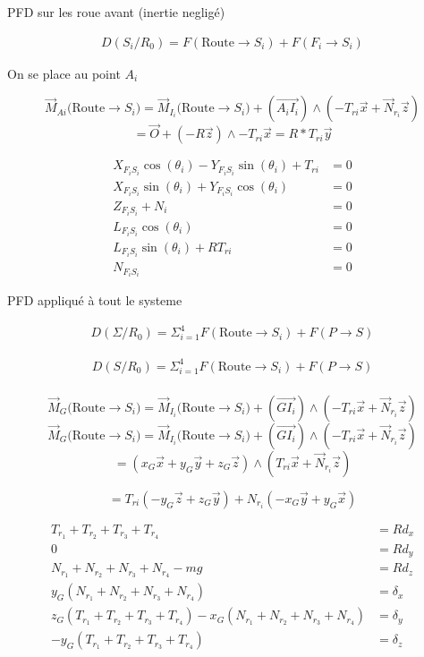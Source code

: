 \documentclass[a4paper,12pt]{report}  %
\begin{document}
PFD sur les roue avant (inertie negligé)

\begin{align}
	D(S_i/R_0) = {F}(\text{Route} \rightarrow S_i) + {F}(F_i \rightarrow S_i) 
\end{align}

On se place au point $A_i$

$$
\vec{M}_{Ai}({\text{Route} \rightarrow S_i)} = \vec{M}_{I_i}({\text{Route}\rightarrow S_i)} + \left( \overrightarrow{A_iI_i} \right) \wedge (-{T}_{ri}\vec{x} + \vec{N}_{r_i} \vec{z})
$$
$$ = \vec{O} + ({-R}\vec{z})\wedge-T_{ri}\vec{x} = R *T_{ri}\vec{y}
$$


\begin{align}
	X_{F_iS_i} \cos(\theta_i) - Y_{F_iS_i} \sin(\theta_i) + T_{ri} &= 0 \tag{13} \\
	X_{F_iS_i}\sin(\theta_i) + Y_{F_iS_i} \cos(\theta_i)&= 0 \tag{14} \\
	Z_{F_iS_i} + N_i &= 0 \tag{15} \\
	L_{F_iS_i} \cos(\theta_i) &= 0 \tag{16} \\
	L_{F_iS_i} \sin(\theta_i) + R T_{ri} &= 0 \tag{17} \\
	N_{F_iS_i} &= 0 \tag{18}
\end{align}


PFD appliqué à tout le systeme


\begin{align}
	D(\Sigma/R_0) = \Sigma_{i=1}^{4}{F}(\text{Route} \rightarrow S_i) + {F}(P \rightarrow S) 
\end{align}



\begin{align}
	D(S/R_0) = \Sigma_{i=1}^{4}{F}(\text{Route} \rightarrow S_i) + {F}(P \rightarrow S) \\
\end{align}


$$
\vec{M}_{G}({\text{Route} \rightarrow S_i)} = \vec{M}_{I_i}({\text{Route}\rightarrow S_i)} + \left( \overrightarrow{GI_i} \right) \wedge (-{T}_{ri}\vec{x} + \vec{N}_{r_i} \vec{z})
$$
$$
\vec{M}_{G}({\text{Route} \rightarrow S_i)} = \vec{M}_{I_i}({\text{Route}\rightarrow S_i)} + \left( \overrightarrow{GI_i} \right) \wedge (-{T}_{ri}\vec{x} + \vec{N}_{r_i} \vec{z})
$$
$$
=(x_G \vec{x} + y_G \vec{y} + z_G \vec{z}) \wedge ({T}_{ri}\vec{x} + \vec{N}_{r_i} \vec{z}) 
$$

$$
={T}_{ri}(-y_G \vec{z} + z_G \vec{y}) + N_{r_i}(-x_G\vec{y} +  y_G\vec{x}) 
$$

\begin{align}
	T_{r_1}+T_{r_2}+T_{r_3}+T_{r_4} &= Rd_x \tag{13}\\
	0 &= Rd_y \tag{14} \\
	N_{r_1}+N_{r_2}+N_{r_3}+N_{r_4}-mg &= Rd_z \tag{15} \\
	y_G(N_{r_1}+N_{r_2}+N_{r_3}+N_{r_4}) &= δ_x \tag{16} \\
	z_G(T_{r_1}+T_{r_2}+T_{r_3}+T_{r_4}) - x_G(N_{r_1}+N_{r_2}+N_{r_3}+N_{r_4}) &= δ_y \tag{17} \\
	-y_G(T_{r_1}+T_{r_2}+T_{r_3}+T_{r_4}) &= δ_z \tag{18}
\end{align}
\end{document}
